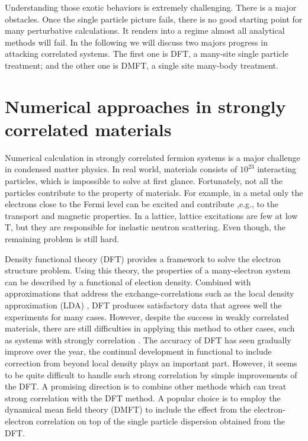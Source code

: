 Understanding those exotic behaviors is extremely challenging. There is a major
obstacles. Once the single particle picture fails, there
is no good starting point for many perturbative calculations. It renders
into a regime almost all analytical methods will fail. In the following we 
will discuss two majors progress in attacking correlated systems. The first one 
is DFT, a many-site single particle treatment; and the other one is DMFT, a single site 
many-body treatment. 

\section{Numerical approaches in strongly correlated materials}
Numerical calculation in strongly correlated fermion systems is a major 
challenge in condensed matter physics. In real world, materials consists of 
$10^{23}$ interacting particles, which is impossible to solve at first glance. 
Fortunately, not all the particles contribute to the property of materials. For 
example, in a metal only the electrons close to the Fermi level can be excited 
and contribute ,e.g., to the transport and magnetic properties. In a lattice, 
lattice excitations are few at low T, but they are responsible for inelastic 
neutron scattering. Even though, the remaining problem is still hard. 

Density functional theory (DFT)\cite{PhysRev.136.B864,PhysRev.140.A1133} 
provides a framework to solve the 
electron structure problem. Using this theory, the properties of a many-electron
system can be described by a functional of election density. Combined with 
approximations that address the exchange-correlations such as the local density 
approximation (LDA) \cite{lundqvist1983}, DFT produces satisfactory data that agrees well the 
experiments for many cases. However, despite the success in weakly correlated 
materials, there are still difficulties in applying this method to other 
cases, such as systems with strongly correlation \cite{0953-8984-9-35-010}. 
The accuracy of DFT has seen gradually improve over the year, the continual
development in functional to include correction from beyond local density 
plays an important part. However, it seems to be quite
difficult to handle such strong correlation by simple improvements of the 
DFT. A promising direction is to combine other methods which can treat
strong correlation with the DFT method. A popular choice is to employ 
the dynamical mean field theory\citep{RevModPhys.68.13,PhysRevB.45.6479} (DMFT)
to include the effect from the electron-electron
correlation on top of the single particle dispersion obtained from the DFT. 

